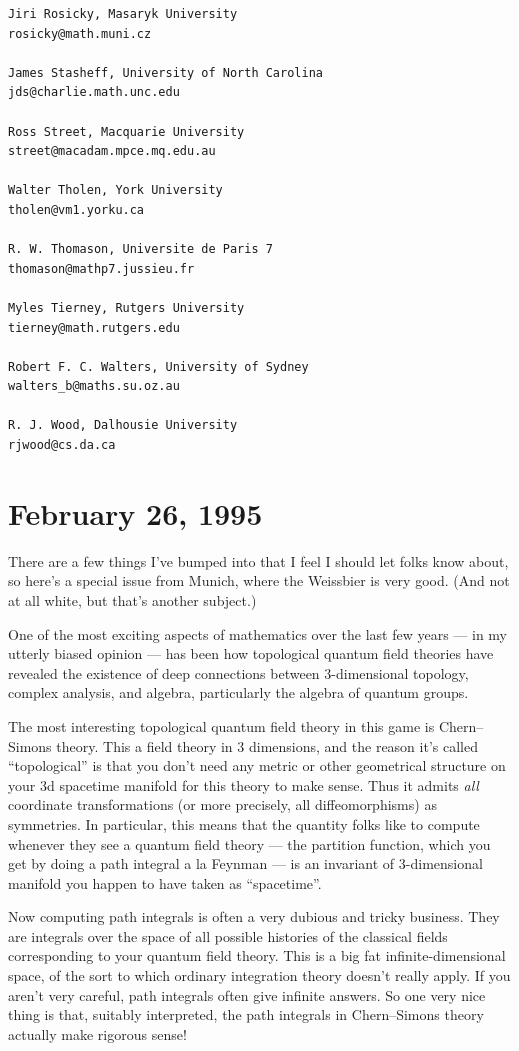 \documentclass[12pt]{article}
\begin{document}
\begin{verbatim}
Jiri Rosicky, Masaryk University
rosicky@math.muni.cz
 
James Stasheff, University of North Carolina
jds@charlie.math.unc.edu
 
Ross Street, Macquarie University 
street@macadam.mpce.mq.edu.au
 
Walter Tholen, York University
tholen@vm1.yorku.ca
 
R. W. Thomason, Universite de Paris 7
thomason@mathp7.jussieu.fr
 
Myles Tierney, Rutgers University
tierney@math.rutgers.edu
 
Robert F. C. Walters, University of Sydney
walters_b@maths.su.oz.au
 
R. J. Wood, Dalhousie University
rjwood@cs.da.ca
\end{verbatim}



\hypertarget{week48}{%
\section{February 26, 1995}\label{week48}}

There are a few things I've bumped into that I feel I should let folks
know about, so here's a special issue from Munich, where the Weissbier
is very good. (And not at all white, but that's another subject.)

One of the most exciting aspects of mathematics over the last few years
--- in my utterly biased opinion --- has been how topological quantum
field theories have revealed the existence of deep connections between
\(3\)-dimensional topology, complex analysis, and algebra, particularly
the algebra of quantum groups.

The most interesting topological quantum field theory in this game is
Chern--Simons theory. This a field theory in 3 dimensions, and the reason
it's called ``topological'' is that you don't need any metric or other
geometrical structure on your 3d spacetime manifold for this theory to
make sense. Thus it admits \emph{all} coordinate transformations (or
more precisely, all diffeomorphisms) as symmetries. In particular, this
means that the quantity folks like to compute whenever they see a
quantum field theory --- the partition function, which you get by doing
a path integral a la Feynman --- is an invariant of \(3\)-dimensional
manifold you happen to have taken as ``spacetime''.

Now computing path integrals is often a very dubious and tricky
business. They are integrals over the space of all possible histories of
the classical fields corresponding to your quantum field theory. This is
a big fat infinite-dimensional space, of the sort to which ordinary
integration theory doesn't really apply. If you aren't very careful,
path integrals often give infinite answers. So one very nice thing is
that, suitably interpreted, the path integrals in Chern--Simons theory
actually make rigorous sense!
\end{document}
